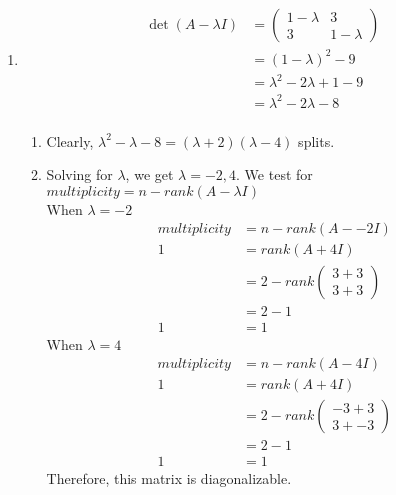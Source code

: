 \documentclass[13pt]{article}
\begin{document}
\begin{enumerate}[label=(\alph*),leftmargin=*]
\item
  \begin{align*}
    \det(A - \lambda I) &=
                          \begin{pmatrix}
                            1 - \lambda & 3 \\
                            3 & 1 - \lambda
                          \end{pmatrix} \\
                        &= (1 - \lambda)^2 - 9 \\
                        &= \lambda^2 - 2\lambda + 1 - 9 \\
                        &= \lambda^2 - 2\lambda - 8 \\
  \end{align*}
  \begin{enumerate}
  \item Clearly, $\lambda^2 - \lambda - 8 = (\lambda + 2)(\lambda - 4)$ splits.
  \item Solving for $\lambda$, we get $\lambda = -2, 4$. We test for $multiplicity = n - rank(A - \lambda I)$ \\
    When $\lambda = -2$
    \begin{align*}
      multiplicity &= n - rank(A - -2I) \\
      1 &= rank(A + 4I) \\
                   &= 2 - rank
                     \begin{pmatrix}
                       3 + 3 \\
                       3 + 3
                     \end{pmatrix} \\
                   &= 2 - 1 \\
      1 &= 1
    \end{align*}
    When $\lambda = 4$
    \begin{align*}
      multiplicity &= n - rank(A - 4I) \\
      1 &= rank(A + 4I) \\
                   &= 2 - rank
                     \begin{pmatrix}
                       -3 + 3 \\
                       3 + -3
                     \end{pmatrix} \\
                   &= 2 - 1 \\
      1 &= 1
    \end{align*}
    Therefore, this matrix is diagonalizable.

\end{enumerate}
\end{enumerate}
\end{document}
